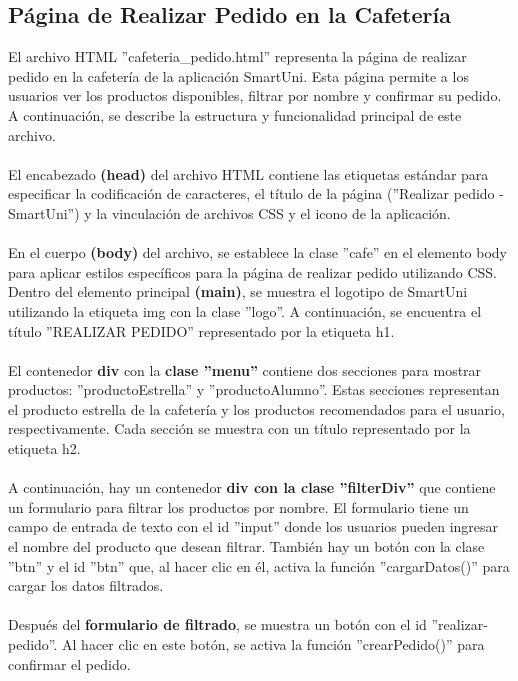 \documentclass[12pt]{report}
\begin{document}
 \subsection{Página de Realizar Pedido en la Cafetería}
El archivo HTML ''cafeteria\_pedido.html'' representa la página de realizar pedido en la cafetería de la aplicación SmartUni. Esta página permite a los usuarios ver los productos disponibles, filtrar por nombre y confirmar su pedido. A continuación, se describe la estructura y funcionalidad principal de este archivo.
\\\\El encabezado\textbf{ (head) }del archivo HTML contiene las etiquetas estándar para especificar la codificación de caracteres, el título de la página (''Realizar pedido - SmartUni'') y la vinculación de archivos CSS y el icono de la aplicación.
\\\\ En el cuerpo \textbf{(body)} del archivo, se establece la clase ''cafe'' en el elemento body para aplicar estilos específicos para la página de realizar pedido utilizando CSS.\\
Dentro del elemento principal \textbf{(main)}, se muestra el logotipo de SmartUni utilizando la etiqueta img con la clase ''logo''. A continuación, se encuentra el título ''REALIZAR PEDIDO'' representado por la etiqueta h1.\\\\
El contenedor \textbf{div} con la \textbf{clase ''menu''} contiene dos secciones para mostrar productos: ''productoEstrella'' y ''productoAlumno''. Estas secciones representan el producto estrella de la cafetería y los productos recomendados para el usuario, respectivamente. Cada sección se muestra con un título representado por la etiqueta h2.
\\\\ A continuación, hay un contenedor \textbf{div con la clase ''filterDiv''} que contiene un formulario para filtrar los productos por nombre. El formulario tiene un campo de entrada de texto con el id ''input'' donde los usuarios pueden ingresar el nombre del producto que desean filtrar. También hay un botón con la clase ''btn'' y el id ''btn'' que, al hacer clic en él, activa la función ''cargarDatos()'' para cargar los datos filtrados.
\\\\Después del \textbf{formulario de filtrado}, se muestra un botón con el id ''realizar-pedido''. Al hacer clic en este botón, se activa la función ''crearPedido()'' para confirmar el pedido.
\end{document}
